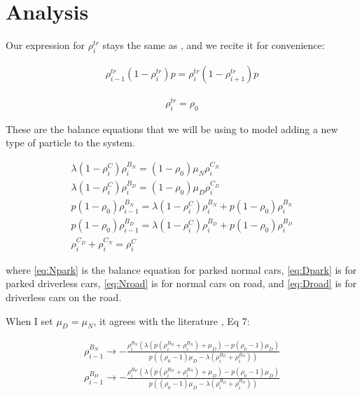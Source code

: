 \documentclass[]{article}
\begin{document}

\section*{Analysis}


Our expression for $\rho_i^{tr}$ stays the same as \cite{adsorption}, and we recite it for convenience:

\begin{align}
\rho_{i-1}^{tr} (1 - \rho_i^{tr}) p = \rho_i^{tr} (1 - \rho_{i+1}^{tr}) p 
\end{align}

\begin{align}
\rho_i^{tr} = \rho_0
\end{align}

These are the balance equations that we will be using to model adding a new type of particle to the system.

\begin{align}
\lambda  \left(1-\rho _i^C\right) \rho _i^{B_N}=\left(1-\rho _0\right)
\mu _N \rho _i^{C_N} \label{eq:Npark}\\
\lambda  \left(1-\rho _i^C\right) \rho
_i^{B_D}=\left(1-\rho _0\right) \mu _D \rho _i^{C_D} \label{eq:Dpark}\\
p \left(1-\rho _0\right)
\rho _{i-1}^{B_N}=\lambda  \left(1-\rho _i^C\right) \rho _i^{B_N}+p
\left(1-\rho _0\right) \rho _i^{B_N} \label{eq:Nroad}\\
p \left(1-\rho _0\right) \rho
_{i-1}^{B_D}=\lambda  \left(1-\rho _i^C\right) \rho _i^{B_D}+p \left(1-\rho
_0\right) \rho _i^{B_D}\label{eq:Droad}\\
\rho _i^{C_D}+\rho _i^{C_N}=\rho _i^C \label{parkingSum}
\end{align}

where \eqref{eq:Npark} is the balance equation for parked normal cars, \eqref{eq:Dpark} is for parked driverless cars, \eqref{eq:Nroad} is for normal cars on road, and \eqref{eq:Droad} is for driverless cars on the road.

When I set $\mu _D = \mu _N$, it agrees with the literature \cite{adsorption}, Eq 7: %

\begin{align}
\rho _{i-1}^{B_N}\to -\frac{\rho _i^{B_N} \left(\lambda  \left(p \left(\rho _i^{B_D}+\rho _i^{B_N}\right)+\mu _D\right)-p \left(\rho _0-1\right) \mu _D\right)}{p
	\left(\left(\rho _0-1\right) \mu _D-\lambda  \left(\rho _i^{B_D}+\rho _i^{B_N}\right)\right)} \\ \rho _{i-1}^{B_D}\to -\frac{\rho _i^{B_D} \left(\lambda  \left(p \left(\rho
	_i^{B_D}+\rho _i^{B_N}\right)+\mu _D\right)-p \left(\rho _0-1\right) \mu _D\right)}{p \left(\left(\rho _0-1\right) \mu _D-\lambda  \left(\rho _i^{B_D}+\rho
	_i^{B_N}\right)\right)}
\end{align}
\end{document}

